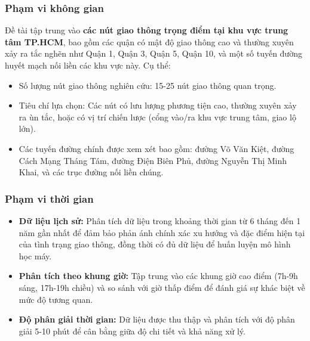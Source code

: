 \subsubsection{Phạm vi không gian}
Đề tài tập trung vào \textbf{các nút giao thông trọng điểm tại khu vực trung tâm TP.HCM}, bao gồm các quận có mật độ giao thông cao và thường xuyên xảy ra tắc nghẽn như Quận 1, Quận 3, Quận 5, Quận 10, và một số tuyến đường huyết mạch nối liền các khu vực này. Cụ thể:

\begin{itemize}
    \item Số lượng nút giao thông nghiên cứu: 15-25 nút giao thông quan trọng.
    \item Tiêu chí lựa chọn: Các nút có lưu lượng phương tiện cao, thường xuyên xảy ra ùn tắc, hoặc có vị trí chiến lược (cổng vào/ra khu vực trung tâm, giao lộ lớn).
    \item Các tuyến đường chính được xem xét bao gồm: đường Võ Văn Kiệt, đường Cách Mạng Tháng Tám, đường Điện Biên Phủ, đường Nguyễn Thị Minh Khai, và các trục đường nối liền chúng.
\end{itemize}

\subsubsection{Phạm vi thời gian}
\begin{itemize}
    \item \textbf{Dữ liệu lịch sử:} Phân tích dữ liệu trong khoảng thời gian từ 6 tháng đến 1 năm gần nhất để đảm bảo phản ánh chính xác xu hướng và đặc điểm hiện tại của tình trạng giao thông, đồng thời có đủ dữ liệu để huấn luyện mô hình học máy.
    
    \item \textbf{Phân tích theo khung giờ:} Tập trung vào các khung giờ cao điểm (7h-9h sáng, 17h-19h chiều) và so sánh với giờ thấp điểm để đánh giá sự khác biệt về mức độ tương quan.
    
    \item \textbf{Độ phân giải thời gian:} Dữ liệu được thu thập và phân tích với độ phân giải 5-10 phút để cân bằng giữa độ chi tiết và khả năng xử lý.
\end{itemize}

